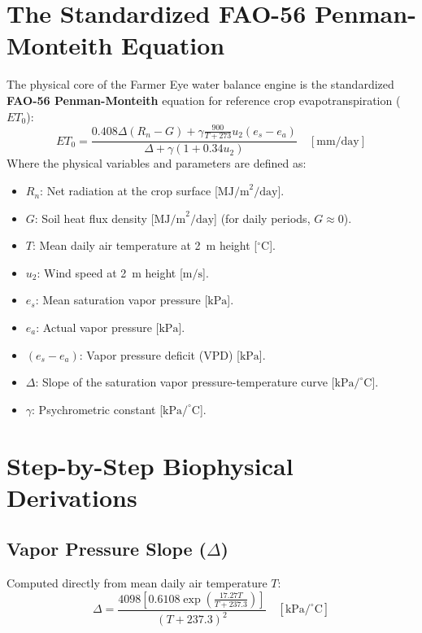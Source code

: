 \documentclass[11pt,a4paper,oneside]{report}
\begin{document}
\section{The Standardized FAO-56 Penman-Monteith Equation}
The physical core of the Farmer Eye water balance engine is the standardized \textbf{FAO-56 Penman-Monteith} equation for reference crop evapotranspiration ($ET_0$):
\begin{equation}
ET_0 = \frac{0.408 \Delta (R_n - G) + \gamma \frac{900}{T + 273} u_2 (e_s - e_a)}{\Delta + \gamma (1 + 0.34 u_2)} \quad [\text{mm/day}]
\label{eq:fao56}
\end{equation}
Where the physical variables and parameters are defined as:
\begin{itemize}[leftmargin=*]
    \item $R_n$: Net radiation at the crop surface [$\text{MJ/m}^2/\text{day}$].
    \item $G$: Soil heat flux density [$\text{MJ/m}^2/\text{day}$] (for daily periods, $G \approx 0$).
    \item $T$: Mean daily air temperature at 2~m height [$^\circ\text{C}$].
    \item $u_2$: Wind speed at 2~m height [$\text{m/s}$].
    \item $e_s$: Mean saturation vapor pressure [$\text{kPa}$].
    \item $e_a$: Actual vapor pressure [$\text{kPa}$].
    \item $(e_s - e_a)$: Vapor pressure deficit (VPD) [$\text{kPa}$].
    \item $\Delta$: Slope of the saturation vapor pressure-temperature curve [$\text{kPa/}^\circ\text{C}$].
    \item $\gamma$: Psychrometric constant [$\text{kPa/}^\circ\text{C}$].
\end{itemize}

\section{Step-by-Step Biophysical Derivations}
\subsection{Vapor Pressure Slope ($\Delta$)}
Computed directly from mean daily air temperature $T$:
\begin{equation}
\Delta = \frac{4098 \left[ 0.6108 \exp\left( \frac{17.27 T}{T + 237.3} \right) \right]}{(T + 237.3)^2} \quad [\text{kPa/}^\circ\text{C}]
\end{equation}
\end{document}
